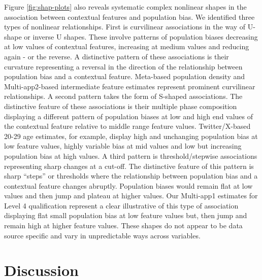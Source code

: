 \documentclass[]{rsos}%
\begin{document}
Figure \ref{fig:shap-plots} also reveals systematic complex nonlinear
shapes in the association between contextual features and population
bias. We identified three types of nonlinear relationships. First is
curvilinear associations in the way of U-shape or inverse U shapes.
These involve patterns of population biases decreasing at low values of
contextual features, increasing at medium values and reducing again - or
the reverse. A distinctive pattern of these associations is their
curvature representing a reversal in the direction of the relationship
between population bias and a contextual feature. Meta-based population
density and Multi-app2-based intermediate feature estimates represent
prominent curvilinear relationships. A second pattern takes the form of
S-shaped associations. The distinctive feature of these associations is
their multiple phase composition displaying a different pattern of
population biases at low and high end values of the contextual feature
relative to middle range feature values. Twitter/X-based 20-29 age
estimates, for example, display high and unchanging population bias at
low feature values, highly variable bias at mid values and low but
increasing population bias at high values. A third pattern is
threshold/stepwise associations representing sharp changes at a cut-off.
The distinctive feature of this pattern is sharp ``steps'' or thresholds
where the relationship between population bias and a contextual feature
changes abruptly. Population biases would remain flat at low values and
then jump and plateau at higher values. Our Multi-app1 estimates for
Level 4 qualification represent a clear illustrative of this type of
association displaying flat small population bias at low feature values
but, then jump and remain high at higher feature values. These shapes do
not appear to be data source specific and vary in unpredictable ways
across variables.

\section{Discussion}\label{discussion}
\end{document}
